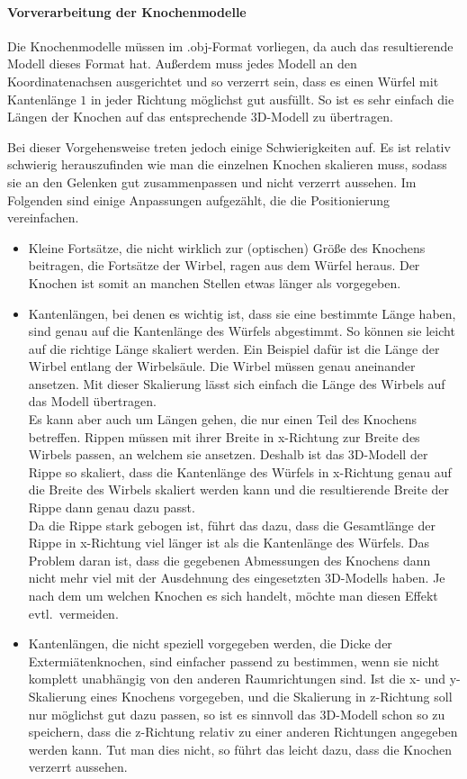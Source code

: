 \paragraph{Vorverarbeitung der Knochenmodelle}

Die Knochenmodelle müssen im .obj-Format vorliegen, da auch das resultierende Modell dieses Format hat. Außerdem muss jedes Modell an den Koordinatenachsen ausgerichtet und so verzerrt sein, dass es einen Würfel mit Kantenlänge $1$ in jeder Richtung möglichst gut ausfüllt. So ist es sehr einfach die Längen der Knochen auf das entsprechende 3D-Modell zu übertragen.

Bei dieser Vorgehensweise treten jedoch einige Schwierigkeiten auf. Es ist \zb  relativ schwierig herauszufinden wie man die einzelnen Knochen skalieren muss, sodass sie an den Gelenken gut zusammenpassen und nicht verzerrt aussehen. Im Folgenden sind einige Anpassungen aufgezählt, die die Positionierung vereinfachen.
\begin{itemize}
 \item Kleine Fortsätze, die nicht wirklich zur (optischen) Größe des Knochens beitragen, \zb die Fortsätze der Wirbel, ragen aus dem Würfel heraus. Der Knochen ist somit an manchen Stellen etwas länger als vorgegeben.
 
 \item Kantenlängen, bei denen es wichtig ist, dass sie eine bestimmte Länge haben, sind genau auf die Kantenlänge des Würfels abgestimmt. So können sie leicht auf die richtige Länge skaliert werden. 
 Ein Beispiel dafür ist die Länge der Wirbel entlang der Wirbelsäule. Die Wirbel müssen genau aneinander ansetzen. Mit dieser Skalierung lässt sich einfach die Länge des Wirbels auf das Modell übertragen.\\
 Es kann aber auch um Längen gehen, die nur einen Teil des Knochens betreffen.
 Rippen müssen \zb mit ihrer Breite in x-Richtung zur Breite des Wirbels passen, an welchem sie ansetzen. Deshalb ist das 3D-Modell der Rippe so skaliert, dass die Kantenlänge des Würfels in x-Richtung genau auf die Breite des Wirbels skaliert werden kann und die resultierende Breite der Rippe dann genau dazu passt.\\
 Da die Rippe stark gebogen ist, führt das dazu, dass die Gesamtlänge der Rippe in x-Richtung viel länger ist als die Kantenlänge des Würfels. Das Problem daran ist, dass die gegebenen Abmessungen des Knochens dann nicht mehr viel mit der Ausdehnung des eingesetzten 3D-Modells haben. Je nach dem um welchen Knochen es sich handelt, möchte man diesen Effekt evtl.\ vermeiden.
 
 \item Kantenlängen, die nicht speziell vorgegeben werden, \zb die Dicke der Extermiätenknochen, sind einfacher passend zu bestimmen, wenn sie nicht komplett unabhängig von den anderen Raumrichtungen sind. Ist \zb die x- und y-Skalierung eines Knochens vorgegeben, und die Skalierung in z-Richtung soll nur möglichst gut dazu passen, so ist es sinnvoll das 3D-Modell schon so zu speichern, dass die z-Richtung relativ zu einer anderen Richtungen angegeben werden kann. Tut man dies nicht, so führt das leicht dazu, dass die Knochen verzerrt aussehen.
\end{itemize}


